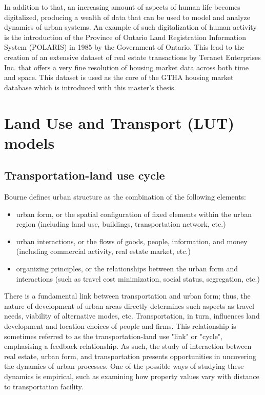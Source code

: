 In addition to that, an increasing amount of aspects of human life becomes digitalized, producing a wealth of data that can be used to model and analyze dynamics of urban systems\cite{Arribas-Bel2014, Chen2016}.
An example of such digitalization of human activity is the introduction of the Province of Ontario Land Registration Information System (POLARIS) in 1985 by the Government of Ontario\cite{TeranetEnterprisesInc.}.
This lead to the creation of an extensive dataset of real estate transactions by Teranet Enterprises Inc.
that offers a very fine resolution of housing market data across both time and space.
This dataset is used as the core of the GTHA housing market database which is introduced with this master's thesis.

\section{Land Use and Transport (LUT) models} \label{sec:evolution_of_models_of_urban_systems}

\subsection{Transportation-land use cycle} \label{subsec:transportation_urban_form_real_estate_data}

Bourne\cite{Bourne1982} defines urban structure as the combination of the following elements:
\begin{itemize}
    \item urban form, or the spatial configuration of fixed elements within the urban region (including land use, buildings, transportation network, etc.)
    \item urban interactions, or the flows of goods, people, information, and money (including commercial activity, real estate market, etc.)
    \item organizing principles, or the relationships between the urban form and interactions (such as travel cost minimization, social status, segregation, etc.)
\end{itemize}
There is a fundamental link between transportation and urban form;
thus, the nature of development of urban areas directly determines such aspects as travel needs, viability of alternative modes, etc.
Transportation, in turn, influences land development and location choices of people and firms\cite{Miller1999}.
This relationship is sometimes referred to as the transportation-land use "link" or "cycle", emphasising a feedback relationship\cite{Kelly}.
As such, the study of interaction between real estate, urban form, and transportation presents opportunities in uncovering the dynamics of urban processes.
One of the possible ways of studying these dynamics is empirical, such as examining how property values vary with distance to transportation facility\cite{Sherry1999}.

